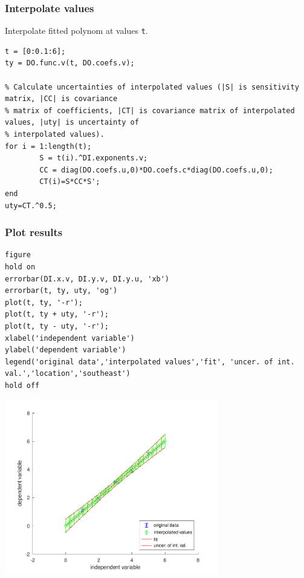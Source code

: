 {}
\subsubsection*{Interpolate values}



Interpolate fitted polynom at values \texttt{t}.

\begin{lstlisting}
t = [0:0.1:6];
ty = DO.func.v(t, DO.coefs.v);

% Calculate uncertainties of interpolated values (|S| is sensitivity matrix, |CC| is covariance
% matrix of coefficients, |CT| is covariance matrix of interpolated values, |uty| is uncertainty of
% interpolated values).
for i = 1:length(t);
        S = t(i).^DI.exponents.v;
        CC = diag(DO.coefs.u,0)*DO.coefs.c*diag(DO.coefs.u,0);
        CT(i)=S*CC*S';
end
uty=CT.^0.5;
\end{lstlisting}


{}
\subsubsection*{Plot results}

\begin{lstlisting}
figure
hold on
errorbar(DI.x.v, DI.y.v, DI.y.u, 'xb')
errorbar(t, ty, uty, 'og')
plot(t, ty, '-r');
plot(t, ty + uty, '-r');
plot(t, ty - uty, '-r');
xlabel('independent variable')
ylabel('dependent variable')
legend('original data','interpolated values','fit', 'uncer. of int. val.','location','southeast')
hold off
\end{lstlisting}
\begin{center}
\includegraphics[width=0.7\textwidth]{algs_examples_published/OEFPIL_alg_example-1.pdf}
\end{center}


\stopcontents[localtoc]
